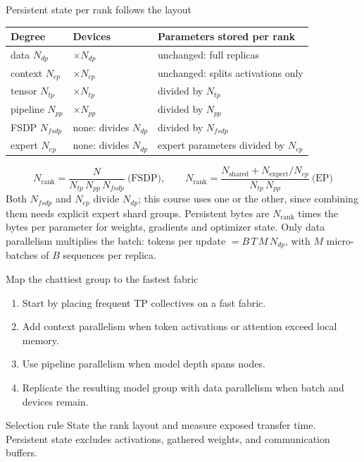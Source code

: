 \documentclass[handout]{beamer}
\begin{document}
\begin{frame}{Persistent state per rank follows the layout}
  \small
  \begin{center}
    \begin{tabular}{@{}lll@{}}
      \toprule
      Degree & Devices & Parameters stored per rank \\
      \midrule
      data $N_{dp}$ & $\times N_{dp}$ & unchanged: full replicas \\
      context $N_{cp}$ & $\times N_{cp}$ & unchanged: splits activations only \\
      tensor $N_{tp}$ & $\times N_{tp}$ & divided by $N_{tp}$ \\
      pipeline $N_{pp}$ & $\times N_{pp}$ & divided by $N_{pp}$ \\
      FSDP $N_{fsdp}$ & none: divides $N_{dp}$ & divided by $N_{fsdp}$ \\
      expert $N_{ep}$ & none: divides $N_{dp}$ & expert parameters divided by $N_{ep}$ \\
      \bottomrule
    \end{tabular}
  \end{center}
  \[
    N_{\text{rank}}=\frac{N}{N_{tp}\,N_{pp}\,N_{fsdp}}\ \text{(FSDP)},
    \qquad
    N_{\text{rank}}=\frac{N_{\text{shared}}+N_{\text{expert}}/N_{ep}}{N_{tp}\,N_{pp}}\ \text{(EP)}
  \]
  \vfill
  Both $N_{fsdp}$ and $N_{ep}$ divide $N_{dp}$; this course uses one or the other, since combining them needs explicit expert shard groups. Persistent bytes are $N_{\text{rank}}$ times the bytes per parameter for weights, gradients and optimizer state. Only data parallelism multiplies the batch: tokens per update $=B\,T\,M\,N_{dp}$, with $M$ micro-batches of $B$ sequences per replica.
\end{frame}

\begin{frame}{Map the chattiest group to the fastest fabric}
  \begin{enumerate}
      \setlength{\itemsep}{7pt}
    \item Start by placing frequent TP collectives on a fast fabric.
    \item Add context parallelism when token activations or attention exceed local memory.
    \item Use pipeline parallelism when model depth spans nodes.
    \item Replicate the resulting model group with data parallelism when batch and devices remain.
  \end{enumerate}
  \begin{alertblock}{Selection rule}
    State the rank layout and measure exposed transfer time. Persistent state excludes activations, gathered weights, and communication buffers.
  \end{alertblock}
\end{frame}
\end{document}
